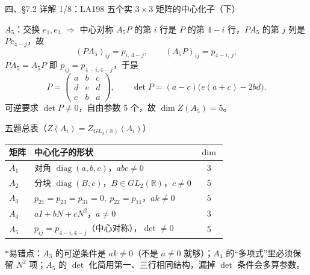 \documentclass[aspectratio=169,10pt,fontset=none]{ctexbeamer}
\newcommand{\starpt}{\textcolor{accent}{\bfseries$\ast$}}
\begin{document}
\begin{frame}[t]{四、\S7.2 详解 1/8：LA198 五个实 $3\times3$ 矩阵的中心化子（下）}
\scriptsize
\begin{block}{\footnotesize $A_5$：交换 $e_1,e_3$ $\Rightarrow$ 中心对称}
$A_5P$ 的第 $i$ 行是 $P$ 的第 $4-i$ 行，$PA_5$ 的第 $j$ 列是 $P e_{4-j}$，故
\[
(PA_5)_{ij}=p_{i,\,4-j},\qquad (A_5P)_{ij}=p_{4-i,\,j};
\]
$PA_5=A_5P$ 即 $p_{ij}=p_{4-i,4-j}$，于是
\[
P=\begin{pmatrix}a&b&c\\d&e&d\\c&b&a\end{pmatrix},\qquad
\det P=(a-c)\bigl(e(a+c)-2bd\bigr).
\]
可逆要求 $\det P\ne0$，自由参数 5 个，故 $\dim Z(A_5)=5$。
\end{block}
\begin{block}{\footnotesize 五题总表（$Z(A_i)=Z_{GL_3(\mathbb R)}(A_i)$）}
\begin{tabular}{@{}l l c@{}}
\toprule
矩阵 & 中心化子的形状 & $\dim$\\
\midrule
$A_1$ & 对角 $\operatorname{diag}(a,b,c)$，$abc\ne0$ & 3\\
$A_2$ & 分块 $\operatorname{diag}(B,c)$，$B\in GL_2(\mathbb R)$，$c\ne0$ & 5\\
$A_3$ & $p_{21}=p_{23}=p_{31}=0,\ p_{22}=p_{11}$，$ak\ne0$ & 5\\
$A_4$ & $aI+bN+cN^2$，$a\ne0$ & 3\\
$A_5$ & $p_{ij}=p_{4-i,4-j}$（中心对称），$\det\ne0$ & 5\\
\bottomrule
\end{tabular}
\end{block}
\footnotesize\color{ink!80}
\starpt 易错点：$A_3$ 的可逆条件是 $ak\ne0$（不是 $a\ne0$ 就够）；$A_4$ 的“多项式”里必须保留 $N^2$ 项；$A_5$ 的 $\det$ 化简用第一、三行相同结构，漏掉 $\det$ 条件会多算参数。
\end{frame}
\end{document}
